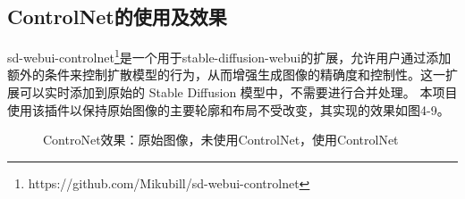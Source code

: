\documentclass[a4paper,AutoFakeBold,oneside,12pt]{book}
\begin{document}
\subsection{ControlNet的使用及效果}
sd-webui-controlnet\footnote{https://github.com/Mikubill/sd-webui-controlnet}是一个用于stable-diffusion-webui的扩展，允许用户通过添加额外的条件来控制扩散模型的行为，从而增强生成图像的精确度和控制性。这一扩展可以实时添加到原始的 Stable Diffusion 模型中，不需要进行合并处理。
本项目使用该插件以保持原始图像的主要轮廓和布局不受改变，其实现的效果如图4-9。
\begin{figure}[!htbp]
    \centering
    \quad %
    \quad %
    \caption{ControNet效果：\protect{}原始图像，\protect{}未使用ControlNet，\protect{}使用ControlNet} %
    \label{Fig:ControlNet} %
\end{figure}
\end{document}
